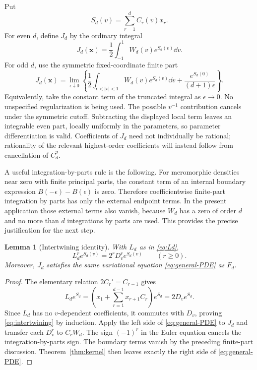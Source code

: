 \documentclass[11pt,letterpaper]{article}
\numberwithin{equation}{section}
\theoremstyle{plain}
\newtheorem{lemma}[theorem]{Lemma}
\theoremstyle{definition}
\theoremstyle{remark}
\begin{document}
Put
\[
 S_d(v)=\sum_{r=1}^d C_r(v)x_r.
\]
For even $d$, define $J_d$ by the ordinary integral
\[
 J_d(\boldsymbol x)=\frac12\int_{-1}^1W_d(v)e^{S_d(v)}\dd v.
\]
For odd $d$, use the symmetric fixed-coordinate finite part
\begin{equation}\label{eq:JFP}
 J_d(\boldsymbol x)=\lim_{\epsilon\downarrow0}
 \left\{\frac12\int_{\epsilon<|v|<1}W_d(v)e^{S_d(v)}\dd v
       +\frac{e^{S_d(0)}}{(d+1)\epsilon}\right\}.
\end{equation}
Equivalently, take the constant term of the truncated integral as $\epsilon\to0$. No unspecified regularization is being used. The possible $v^{-1}$ contribution cancels under the symmetric cutoff. Subtracting the displayed local term leaves an integrable even part, locally uniformly in the parameters, so parameter differentiation is valid. Coefficients of $J_d$ need not individually be rational; rationality of the relevant highest-order coefficients will instead follow from cancellation of $C_d^2$.

A useful integration-by-parts rule is the following. For meromorphic densities near zero with finite principal parts, the constant term of an internal boundary expression $B(-\epsilon)-B(\epsilon)$ is zero. Therefore coefficientwise finite-part integration by parts has only the external endpoint terms. In the present application those external terms also vanish, because $W_d$ has a zero of order $d$ and no more than $d$ integrations by parts are used. This provides the precise justification for the next step.

\begin{lemma}[Intertwining identity]\label{lem:intertwining}
With $L_d$ as in \eqref{eq:Ld},
\begin{equation}\label{eq:intertwining}
 L_d^r e^{S_d(v)}=2^rD_v^r e^{S_d(v)}\qquad(r\ge0).
\end{equation}
Moreover, $J_d$ satisfies the same variational equation \eqref{eq:general-PDE} as $F_d$.
\end{lemma}

\begin{proof}
The elementary relation $2C_r'=C_{r-1}$ gives
\[
 L_de^{S_d}=
 \left(x_1+\sum_{r=1}^{d-1}x_{r+1}C_r\right)e^{S_d}
 =2D_ve^{S_d}.
\]
Since $L_d$ has no $v$-dependent coefficients, it commutes with $D_v$, proving \eqref{eq:intertwining} by induction. Apply the left side of \eqref{eq:general-PDE} to $J_d$ and transfer each $D_v^r$ to $C_rW_d$. The sign $(-1)^r$ in the Euler equation cancels the integration-by-parts sign. The boundary terms vanish by the preceding finite-part discussion. Theorem~\ref{thm:kernel} then leaves exactly the right side of \eqref{eq:general-PDE}.
\end{proof}
\end{document}
